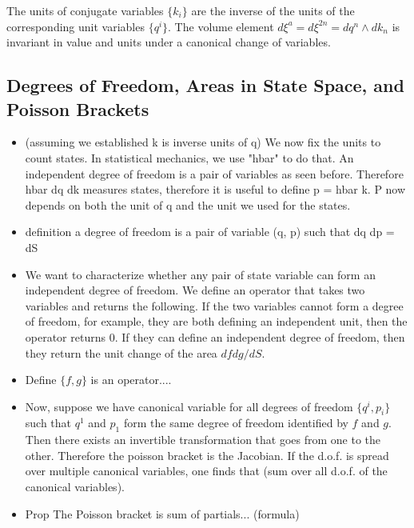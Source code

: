 \documentclass{article}
\begin{document}
\begin{prop}
	The units of conjugate variables $\{k_i\}$ are the inverse of the units of the corresponding unit variables $\{q^i\}$. The volume element $d\xi^a = d\xi^{2n} = dq^n \land dk_n$ is invariant in value and units under a canonical change of variables.
\end{prop}

\subsection{Degrees of Freedom, Areas in State Space, and Poisson Brackets}
\begin{itemize}
	
	\item (assuming we established k is inverse units of q) We now fix the units to count states. In statistical mechanics, we use "hbar" to do that. An independent degree of freedom is a pair of variables as seen before. Therefore hbar dq dk measures states, therefore it is useful to define p = hbar k. P now depends on both the unit of q and the unit we used for the states.
	
	\item definition a degree of freedom is a pair of variable (q, p) such that dq dp = dS
	
	\item We want to characterize whether any pair of state variable can form an independent degree of freedom. We define an operator that takes two variables and returns the following. If the two variables cannot form a degree of freedom, for example, they are both defining an independent unit, then the operator returns 0. If they can define an independent degree of freedom, then they return the unit change of the area $df dg/dS$.
	
	\item Define $\{ f , g\}$ is an operator....
	
	\item Now, suppose we have canonical variable for all degrees of freedom $\{q^i, p_i\}$ such that $q^1$ and $p_1$ form the same degree of freedom identified by $f$ and $g$. Then there exists an invertible transformation that goes from one to the other. Therefore the poisson bracket is the Jacobian. If the d.o.f. is spread over multiple canonical variables, one finds that (sum over all d.o.f. of the canonical variables).
	
	\item Prop The Poisson bracket is sum of partials... (formula)
\end{itemize}
\end{document}
